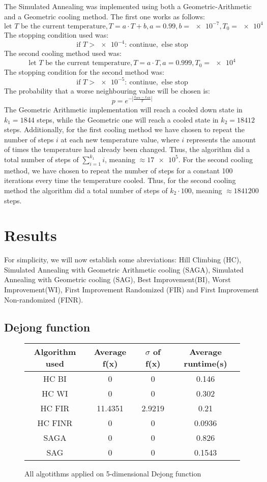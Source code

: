\documentclass{article}
\newcommand{\euler}{e}
\begin{document}
The Simulated Annealing was implemented using both a Geometric-Arithmetic and a Geometric cooling method. The first one works as follows:
$$ \text{let } T \text{ be the current temperature}, T = a \cdot T + b, a = 0.99, b = \num{e-7}, T_0 = \num{e4} $$
The stopping condition used was:
$$ \text{if } T > \num{e-4}\colon\  \text{continue}, \text{ else stop} $$
The second cooling method used was:
$$ \text{let } T \text{ be the current temperature}, T = a \cdot T, a = 0.999, T_0 = \num{e4} $$
The stopping condition for the second method was:
$$ \text{if } T > \num{e-5}\colon\  \text{continue}, \text{ else stop} $$
The probability that a worse neighbouring value will be chosen is: 
$$p = \euler^{-|\frac{x_{\text{new}} - x_{\text{old}}}{T}|}$$
The Geometric Arithmetic implementation will reach a cooled down state in $ k_1 = 1844 $ steps, while the Geometric one will reach a cooled state in $ k_2 = 18412 $ steps. Additionally, for the first cooling method we have chosen to repeat the number of steps $i$ at each new temperature value, where $i$ represents the amount of times the temperature had already been changed. Thus, the algorithm did a total number of steps of $ \sum_{i = 1}^{k_1} i $, meaning $\approx \num{17e5} $. For the second cooling method, we have chosen to repeat the number of steps for a constant 100 iterations every time the temperature cooled. Thus, for the second cooling method the algorithm did a total number of steps of $k_2 \cdot 100$, meaning $\approx 1841200 $ steps.

\section{Results}

For simplicity, we will now establish some abreviations: Hill Climbing (HC), Simulated Annealing with Geometric Arithmetic cooling (SAGA), Simulated Annealing with Geometric cooling (SAG), Best Improvement(BI), Worst Improvement(WI), First Improvement Randomized (FIR) and First Improvement Non-randomized (FINR).

\subsection{Dejong function}

\begin{figure}[H]
	\begin{tabular}{|c||c|c|c|} \hline
		Algorithm used & Average f(x) & $\sigma$ of f(x) & Average runtime(s) \\ \hline \hline
		HC BI & 0 & 0 & 0.146 \\ \hline
		HC WI & 0 & 0 & 0.302 \\ \hline
		HC FIR & 11.4351 & 2.9219 & 0.21 \\ \hline
		HC FINR & 0 & 0 & 0.0936 \\ \hline
		SAGA & 0 & 0 & 0.826 \\ \hline
		SAG & 0 & 0 & 0.1543 \\ \hline
\end{tabular}
\caption{All algotithms applied on 5-dimensional Dejong function}
\end{figure}
\end{document}
